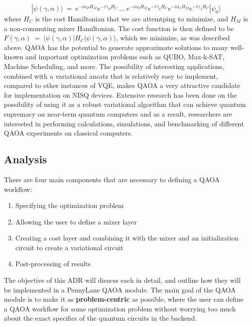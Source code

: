 \documentclass{article}
\begin{document}
$$|\psi(\gamma, \alpha)\rangle \ = \ e^{-i \alpha_P H_M} e^{-i \gamma_P H_C} \ ... \  e^{-i \alpha_2 H_M} e^{-i \gamma_2 H_C}  e^{-i \alpha_1 H_M} e^{-i \gamma_1 H_C} |\psi_0\rangle$$
\noindent
where $H_C$ is the cost Hamiltonian that we are attemtping to minimize, and $H_M$ is a non-commuting mixer Hamiltonian.
\newline\newline
\noindent
The cost function is then defined to be $F(\gamma, \alpha) \ = \ \langle \psi(\gamma, \alpha) | H_C | \psi (\gamma, \alpha) \rangle$, which 
we minimize, as was described above.
\newline\newline
\noindent
QAOA has the potential to generate approximate solutions to many well-known and important optimization problems 
such as QUBO, Max-k-SAT, Machine Scheduling, and more. The possibility of interesting applications, combined 
with a variational ansatz that is relatively easy to implement, compared to other instances of VQE, makes QAOA 
a very attractive candidate for implementation on NISQ devices. Extensive research 
has been done on the possibility of using it as a robust variational algorithm that can 
achieve quantum supremacy on near-term quantum computers and as 
a result, researchers are interested in performing calculations, simulations, and benchmarking of different 
QAOA experiments on classical computers.


\subsection{Analysis}

There are four main components that are necessary to defining a QAOA workflow:

\begin{enumerate}
	\item Specifying the optimization problem
	\item Allowing the user to define a mixer layer
	\item Creating a cost layer and combining it with the mixer and an initialization circuit 
	      to create a variational circuit
      	\item Post-processing of results 
\end{enumerate}
\noindent
The objective of this ADR will disucss each in detail, and outline how they will be implemented in 
a PennyLane QAOA module.
\newline\newline
The main goal of the QAOA module is to make it as \textbf{problem-centric} as possible, 
where the user can define a QAOA workflow for some optimization problem without 
worrying too much about the exact specifics of the quantum circuits in the backend.
\end{document}
